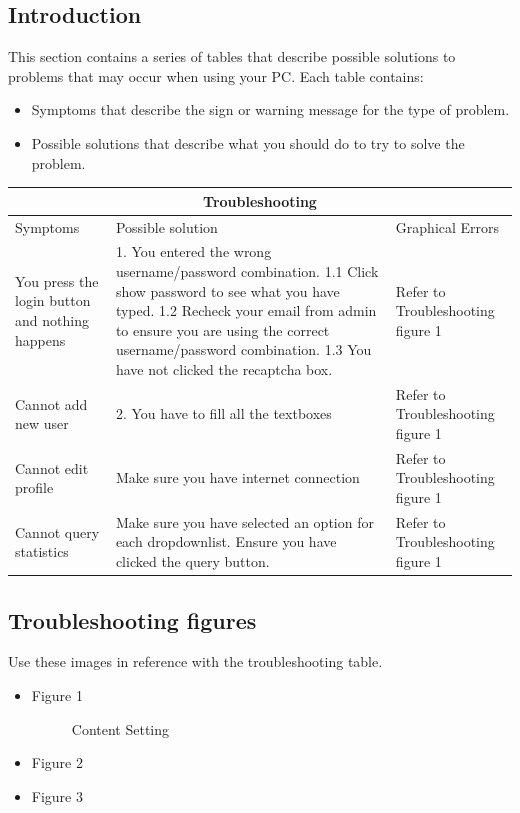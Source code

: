 \documentclass[14pt, a4paper]{article}
\begin{document}
\subsection{Introduction}
This section contains a series of tables that describe
possible solutions to problems that may occur when
using your PC. Each table contains: \\
\begin{itemize}
	\item Symptoms that describe the sign or warning message for the type of problem.
	\item Possible solutions that describe what you should
do to try to solve the problem. 
\end{itemize}

\setlength{\arrayrulewidth}{1mm}
\setlength{\tabcolsep}{18pt}
\renewcommand{\arraystretch}{1.5}
 

\begin{tabular}{ |p{3.5cm}|p{3.5cm} | p{3.5cm}|  }
\hline
\multicolumn{3}{|c|}{Troubleshooting} \\
\hline
Symptoms & Possible solution  & Graphical Errors\\
\hline
You press the login button and nothing happens & 1. You entered the wrong username/password combination. 1.1 Click show password to see what you have typed. 1.2 Recheck your email from admin to ensure you are using the correct username/password combination. 1.3 You have not clicked the recaptcha box.   & Refer to Troubleshooting figure 1\\ \hline
Cannot add new user & 2. You have to fill all the textboxes & Refer to Troubleshooting figure 1\\ \hline
Cannot edit profile    &Make sure you have internet connection & Refer to Troubleshooting figure 1 \\ \hline
Cannot query statistics & Make sure you have selected an option for each dropdownlist. Ensure you have clicked the query button.  & Refer to Troubleshooting figure 1\\
\hline
\end{tabular}

\subsection{Troubleshooting figures}
Use these images in reference with the troubleshooting table.

\begin{itemize}
	\item Figure 1
	\begin{figure}[H]
        \centerline{}
		\caption{Content Setting}
      \end{figure}
	\item Figure 2
	
	\item Figure 3
\end{itemize}
\end{document}

